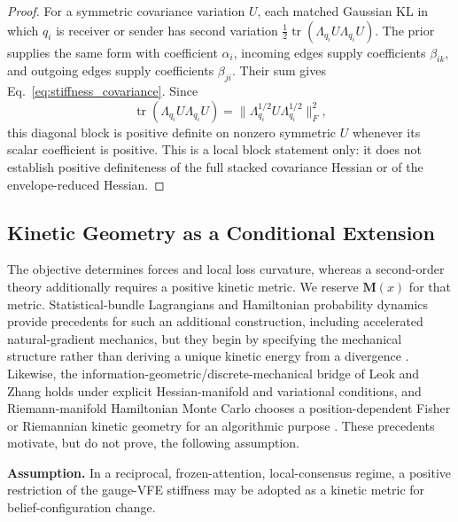 \documentclass[12pt]{article}
\begin{document}
\begin{proof}
For a symmetric covariance variation $U$, each matched Gaussian KL in which $q_i$ is receiver or sender has second variation $\frac12\operatorname{tr}(\Lambda_{q_i}U\Lambda_{q_i}U)$. The prior supplies the same form with coefficient $\alpha_i$, incoming edges supply coefficients $\beta_{ik}$, and outgoing edges supply coefficients $\beta_{ji}$. Their sum gives Eq.~\eqref{eq:stiffness_covariance}. Since
\begin{equation}
\operatorname{tr}(\Lambda_{q_i}U\Lambda_{q_i}U)
=\|\Lambda_{q_i}^{1/2}U\Lambda_{q_i}^{1/2}\|_F^2,
\end{equation}
this diagonal block is positive definite on nonzero symmetric $U$ whenever its scalar coefficient is positive. This is a local block statement only: it does not establish positive definiteness of the full stacked covariance Hessian or of the envelope-reduced Hessian.
\end{proof}

\subsection{Kinetic Geometry as a Conditional Extension}
\label{sec:hamiltonian}

The objective determines forces and local loss curvature, whereas a second-order theory additionally requires a positive kinetic metric.  We reserve $\mathbf M(x)$ for that metric.  Statistical-bundle Lagrangians and Hamiltonian probability dynamics provide precedents for such an additional construction, including accelerated natural-gradient mechanics, but they begin by specifying the mechanical structure rather than deriving a unique kinetic energy from a divergence \citep{Pistone2018StatisticalBundle,ChircoMalagoPistone2022}.  Likewise, the information-geometric/discrete-mechanical bridge of Leok and Zhang holds under explicit Hessian-manifold and variational conditions, and Riemann-manifold Hamiltonian Monte Carlo chooses a position-dependent Fisher or Riemannian kinetic geometry for an algorithmic purpose \citep{LeokZhang2017,GirolamiCalderhead2011}.  These precedents motivate, but do not prove, the following assumption.

\begin{tcolorbox}[colback=gray!5,colframe=gray!75,title=Kinetic-metric postulate]
\textbf{Assumption.} In a reciprocal, frozen-attention, local-consensus regime, a positive restriction of the gauge-VFE stiffness may be adopted as a kinetic metric for belief-configuration change.
\end{tcolorbox}
\end{document}
